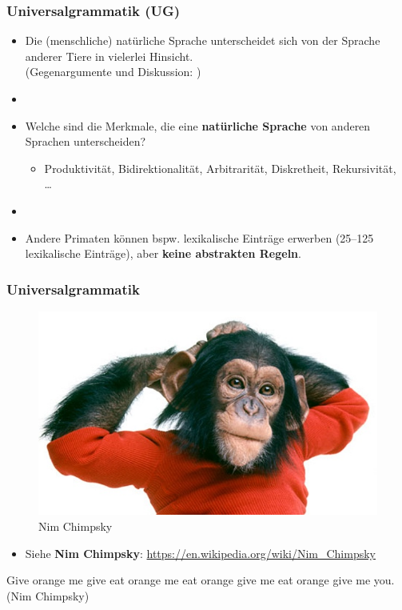 \begin{frame}
\frametitle{Universalgrammatik (UG)}

\begin{itemize}

	\item Die (menschliche) natürliche Sprache unterscheidet sich von der Sprache anderer Tiere in vielerlei Hinsicht. \citep[vgl. \zB][]{Hockett60x, Pinker95a}\\
	(Gegenargumente und Diskussion: \citealt{Evans&Levinson09a, MuellerS15b})
	\item[]
	\item Welche sind die Merkmale, die eine \textbf{natürliche Sprache} von anderen Sprachen unterscheiden? 
	\begin{itemize}
		\item Produktivität, Bidirektionalität, Arbitrarität, Diskretheit, Rekursivität, \dots\ \citep[vgl.][]{Hockett60x, Luedeling2009a}
	\end{itemize}


	\item[]
	\item Andere Primaten können bspw. lexikalische Einträge erwerben (25--125 lexikalische Einträge), aber \textbf{keine abstrakten Regeln}.
\end{itemize}

\end{frame}


\begin{frame}
\frametitle{Universalgrammatik}

\begin{figure}
\centering
	\includegraphics[scale=.26]{material/06nimchimpsky}
	\caption{Nim Chimpsky}
\end{figure}

\begin{itemize}
	\item Siehe \textbf{Nim Chimpsky}: \url{https://en.wikipedia.org/wiki/Nim_Chimpsky}
\end{itemize}

	\ea Give orange me give eat orange me eat orange give me eat orange give me you. \hfill (Nim Chimpsky)
	\z



\end{frame}


